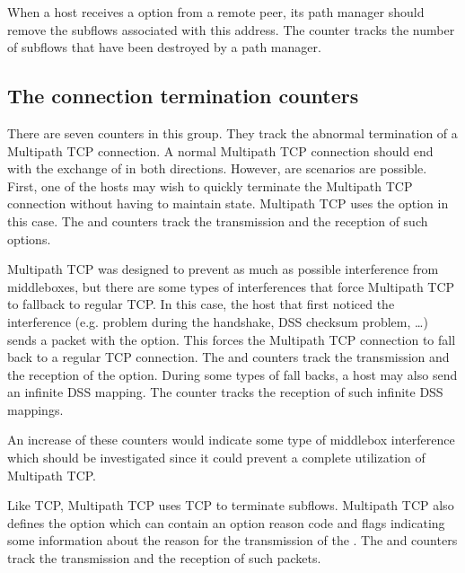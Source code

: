 \documentclass[letterpaper,10pt,english]{sphinxmanual}
\begin{document}
\sphinxAtStartPar
When a host receives a  option from a remote peer, its path
manager should remove the subflows associated with this address. The
 counter tracks the number of subflows that have
been destroyed by a path manager.


\subsection{The connection termination counters}
\label{\detokenize{mptcp-linux:the-connection-termination-counters}}
\sphinxAtStartPar
There are seven counters in this group. They track the abnormal termination of
a Multipath TCP connection. A normal Multipath TCP connection should end
with the exchange of  in both directions. However, are scenarios
are possible. First, one of the hosts may wish to quickly terminate the
Multipath TCP connection without having to maintain state. Multipath TCP
uses the  option
in this case. The  and 
counters track the transmission and the reception of such options.

\sphinxAtStartPar
Multipath TCP was designed to prevent as much as possible interference
from middleboxes, but there are some types of interferences that force
Multipath TCP to fallback to regular TCP. In this case, the host that first
noticed the interference (e.g. problem during the handshake, DSS checksum
problem, …) sends a packet with the  option. This forces the
Multipath TCP connection to fall back to a regular TCP connection.
The  and  counters track the
transmission and the reception of the  option. During some
types of fall backs, a host may also send an infinite DSS mapping. The
 counter tracks the reception of such infinite
DSS mappings.

\sphinxAtStartPar
An increase of
these counters would indicate some type of middlebox interference which
should be investigated since it could prevent a complete utilization of
Multipath TCP.

\sphinxAtStartPar
Like TCP, Multipath TCP uses TCP  to terminate subflows. Multipath
TCP also defines the  option which can contain an option reason
code and flags indicating some information about the reason for the
transmission of the . The  and 
counters track the transmission and the reception of such  packets.
\end{document}
